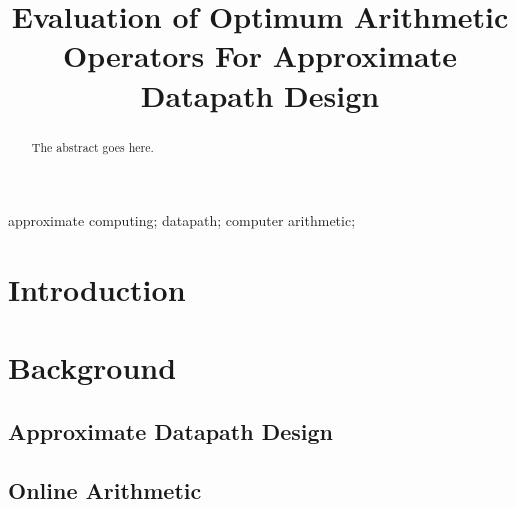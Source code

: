 \documentclass[10pt, conference, compsocconf]{IEEEtran}
\begin{document}
\title{Evaluation of Optimum Arithmetic Operators For Approximate Datapath Design}



\author{
}


\maketitle


\begin{abstract}
The abstract goes here. 

\end{abstract}

\begin{IEEEkeywords}
approximate computing; datapath; computer arithmetic;

\end{IEEEkeywords}


\section{Introduction}

\section{Background}
\subsection{Approximate Datapath Design}

\subsection{Online Arithmetic}
\end{document}
